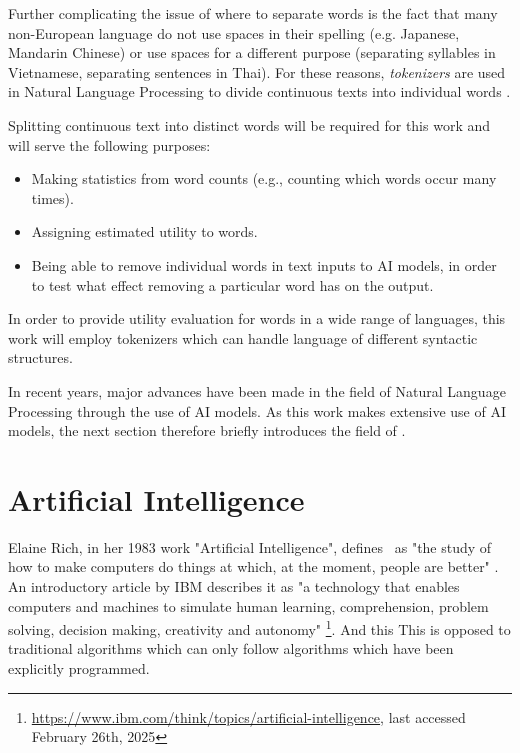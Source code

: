 Further complicating the issue of where to separate words is the fact that many non-European language do not use spaces in their spelling (e.g. Japanese, Mandarin Chinese) or use spaces for a different purpose (separating syllables in Vietnamese, separating sentences in Thai).
For these reasons, \textit{tokenizers} are used in Natural Language Processing to divide continuous texts into individual words \cite{jurafskySpeechLanguageProcessing2025}.

Splitting continuous text into distinct words will be required for this work and will serve the following purposes:
\begin{itemize}
	\item Making statistics from word counts (e.g., counting which words occur many times).
	\item Assigning estimated utility to words.
	\item Being able to remove individual words in text inputs to AI models, in order to test what effect removing a particular word has on the output.
\end{itemize}

In order to provide utility evaluation for words in a wide range of languages, this work will employ tokenizers which can handle language of different syntactic structures.

In recent years, major advances have been made in the field of Natural Language Processing through the use of AI models.
As this work makes extensive use of AI models, the next section therefore briefly introduces the field of \AI.

\section{Artificial Intelligence}
Elaine Rich, in her 1983 work "Artificial Intelligence", defines \AI\ as "the study of how to make computers do things at which, at the moment, people are better" \cite{rich1983artificial}.
An introductory article by IBM describes it as "a technology that enables computers and machines to simulate human learning, comprehension, problem solving, decision making, creativity and autonomy" \footnote{\url{https://www.ibm.com/think/topics/artificial-intelligence}, last accessed February 26th, 2025}.
And this
This is opposed to traditional algorithms which can only follow algorithms which have been explicitly programmed.

